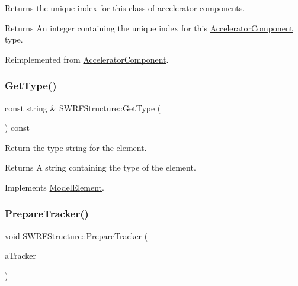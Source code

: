 Returns the unique index for this class of accelerator components. \begin{DoxyReturn}{Returns}
An integer containing the unique index for this \hyperlink{classAcceleratorComponent}{Accelerator\+Component} type. 
\end{DoxyReturn}


Reimplemented from \hyperlink{classAcceleratorComponent_abd1490171ac9af6004d3da01fb3b95fb}{Accelerator\+Component}.

\mbox{\label{classSWRFStructure_aad97277c40295deeda896f9d710330e7}} 
\subsubsection{\texorpdfstring{Get\+Type()}{GetType()}}
{\footnotesize\ttfamily const string \& S\+W\+R\+F\+Structure\+::\+Get\+Type (\begin{DoxyParamCaption}{ }\end{DoxyParamCaption}) const\hspace{0.3cm}{\ttfamily [virtual]}}

Return the type string for the element. \begin{DoxyReturn}{Returns}
A string containing the type of the element. 
\end{DoxyReturn}


Implements \hyperlink{classModelElement_a04dc2e51e1999fca612eb1838ec6b271}{Model\+Element}.

\mbox{\label{classSWRFStructure_a94055441f2ca53c2ccf20e7a07c502b8}} 
\subsubsection{\texorpdfstring{Prepare\+Tracker()}{PrepareTracker()}}
{\footnotesize\ttfamily void S\+W\+R\+F\+Structure\+::\+Prepare\+Tracker (\begin{DoxyParamCaption}\item[{\hyperlink{classComponentTracker}{Component\+Tracker} \&}]{a\+Tracker }\end{DoxyParamCaption})\hspace{0.3cm}{\ttfamily [virtual]}}

